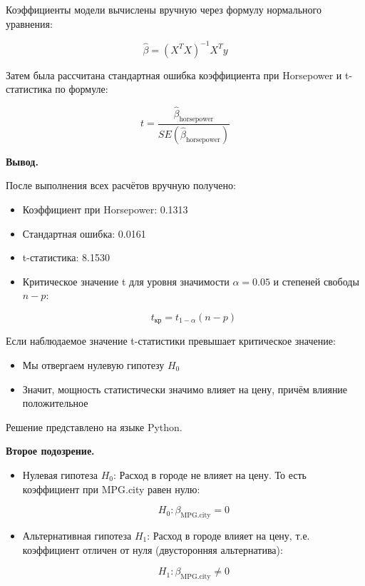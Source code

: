 \documentclass[12pt]{article}
\begin{document}
	Коэффициенты модели вычислены вручную через формулу нормального уравнения:
	
	$$ \hat{\beta} = (X^T X)^{-1} X^T y $$
	
	Затем была рассчитана стандартная ошибка коэффициента при Horsepower и t-статистика по формуле:
	
	$$ t = \frac{\hat{\beta}_{\text{horsepower}}}{SE(\hat{\beta}_{\text{horsepower}})} $$
	
	\textbf{Вывод.}
	
	После выполнения всех расчётов вручную получено:
	
	\begin{itemize}
		\item Коэффициент при Horsepower: 0.1313
		\item Стандартная ошибка: 0.0161
		\item t-статистика: 8.1530
		\item Критическое значение t для уровня значимости $\alpha = 0.05$ и степеней свободы $n - p$:
		
		$$ t_{\text{кр}} = t_{1-\alpha}(n - p) $$
	\end{itemize}
	
	Если наблюдаемое значение t-статистики превышает критическое значение:
	
	\begin{itemize}
		\item Мы отвергаем нулевую гипотезу $H_0$
		\item Значит, мощность статистически значимо влияет на цену, причём влияние положительное
	\end{itemize}
	
	Решение представлено на языке Python.
	\vspace*{1em}
	
	\textbf{Второе подозрение.}
	
	\begin{itemize}
		\item Нулевая гипотеза $H_0$: Расход в городе не влияет на цену. То есть коэффициент при MPG.city равен нулю:
		
		$$ H_0: \beta_{\text{MPG.city}} = 0 $$
		
		\item Альтернативная гипотеза $H_1$: Расход в городе влияет на цену, т.е. коэффициент отличен от нуля (двусторонняя альтернатива):
		
		$$ H_1: \beta_{\text{MPG.city}} \ne 0 $$
	\end{itemize}
	
\end{document}
